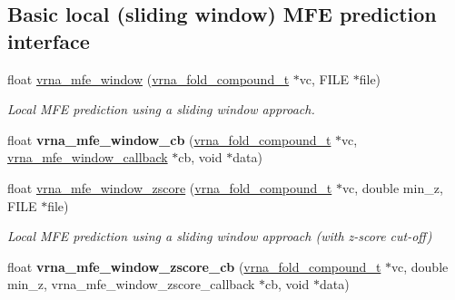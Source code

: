 \subsection*{Basic local (sliding window) M\+FE prediction interface}
\begin{DoxyCompactItemize}
\item 
float \hyperlink{group__mfe__window_ga689df235a1915a1ad56e377383c044ce}{vrna\+\_\+mfe\+\_\+window} (\hyperlink{group__fold__compound_ga1b0cef17fd40466cef5968eaeeff6166}{vrna\+\_\+fold\+\_\+compound\+\_\+t} $\ast$vc, F\+I\+LE $\ast$file)
\begin{DoxyCompactList}\small\item\em Local M\+FE prediction using a sliding window approach. \end{DoxyCompactList}\item 
\mbox{\label{group__mfe__window_gad4995894b294ddb8550af444a0decbd1}} 
float {\bfseries vrna\+\_\+mfe\+\_\+window\+\_\+cb} (\hyperlink{group__fold__compound_ga1b0cef17fd40466cef5968eaeeff6166}{vrna\+\_\+fold\+\_\+compound\+\_\+t} $\ast$vc, \hyperlink{group__mfe__window_ga4f3e5bc214ef803074ace313cb9571b4}{vrna\+\_\+mfe\+\_\+window\+\_\+callback} $\ast$cb, void $\ast$data)
\item 
float \hyperlink{group__mfe__window_gaa4f67ae94efd08d800c17f9b53423fd6}{vrna\+\_\+mfe\+\_\+window\+\_\+zscore} (\hyperlink{group__fold__compound_ga1b0cef17fd40466cef5968eaeeff6166}{vrna\+\_\+fold\+\_\+compound\+\_\+t} $\ast$vc, double min\+\_\+z, F\+I\+LE $\ast$file)
\begin{DoxyCompactList}\small\item\em Local M\+FE prediction using a sliding window approach (with z-\/score cut-\/off) \end{DoxyCompactList}\item 
\mbox{\label{group__mfe__window_ga2762be816af3dbc18c256e44c1345e4f}} 
float {\bfseries vrna\+\_\+mfe\+\_\+window\+\_\+zscore\+\_\+cb} (\hyperlink{group__fold__compound_ga1b0cef17fd40466cef5968eaeeff6166}{vrna\+\_\+fold\+\_\+compound\+\_\+t} $\ast$vc, double min\+\_\+z, vrna\+\_\+mfe\+\_\+window\+\_\+zscore\+\_\+callback $\ast$cb, void $\ast$data)
\end{DoxyCompactItemize}
